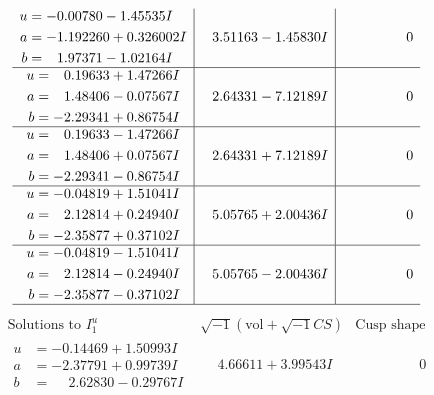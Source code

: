 \documentclass[1p]{elsarticle_modified}
\theoremstyle{definition}
\newcommand{\I}{\sqrt{-1}}
\begin{document}
$$\begin{array}{c|c|c}
\begin{aligned}
u &= -0.00780 - 1.45535 I \\
a &= -1.192260 + 0.326002 I \\
b &= \phantom{-}1.97371 - 1.02164 I\end{aligned}
 & \phantom{-}3.51163 - 1.45830 I & \phantom{-0.000000 } 0 \\ \hline\begin{aligned}
u &= \phantom{-}0.19633 + 1.47266 I \\
a &= \phantom{-}1.48406 - 0.07567 I \\
b &= -2.29341 + 0.86754 I\end{aligned}
 & \phantom{-}2.64331 - 7.12189 I & \phantom{-0.000000 } 0 \\ \hline\begin{aligned}
u &= \phantom{-}0.19633 - 1.47266 I \\
a &= \phantom{-}1.48406 + 0.07567 I \\
b &= -2.29341 - 0.86754 I\end{aligned}
 & \phantom{-}2.64331 + 7.12189 I & \phantom{-0.000000 } 0 \\ \hline\begin{aligned}
u &= -0.04819 + 1.51041 I \\
a &= \phantom{-}2.12814 + 0.24940 I \\
b &= -2.35877 + 0.37102 I\end{aligned}
 & \phantom{-}5.05765 + 2.00436 I & \phantom{-0.000000 } 0 \\ \hline\begin{aligned}
u &= -0.04819 - 1.51041 I \\
a &= \phantom{-}2.12814 - 0.24940 I \\
b &= -2.35877 - 0.37102 I\end{aligned}
 & \phantom{-}5.05765 - 2.00436 I & \phantom{-0.000000 } 0\\
 \hline 
 \end{array}$$\newpage$$\begin{array}{c|c|c}  
\text{Solutions to }I^u_{1}& \I (\text{vol} + \sqrt{-1}CS) & \text{Cusp shape}\\
 \hline 
\begin{aligned}
u &= -0.14469 + 1.50993 I \\
a &= -2.37791 + 0.99739 I \\
b &= \phantom{-}2.62830 - 0.29767 I\end{aligned}
 & \phantom{-}4.66611 + 3.99543 I & \phantom{-0.000000 } 0 \\ \hline\begin{aligned}

\end{aligned}
\end{array}$$
\end{document}
